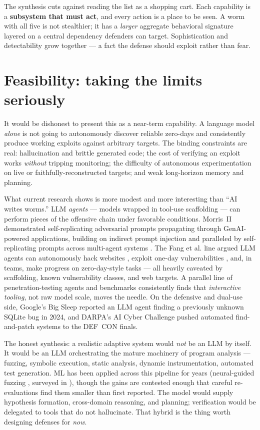 \documentclass[11pt,a4paper]{article}
\begin{document}
The synthesis cuts against reading the list as a shopping cart. Each capability is a \textbf{subsystem that must act}, and every action is a place to be seen. A worm with all five is not stealthier; it has a \emph{larger} aggregate behavioral signature layered on a central dependency defenders can target. Sophistication and detectability grow together --- a fact the defense should exploit rather than fear.

\section{Feasibility: taking the limits seriously}

It would be dishonest to present this as a near-term capability. A language model \emph{alone} is not going to autonomously discover reliable zero-days and consistently produce working exploits against arbitrary targets. The binding constraints are real: hallucination and brittle generated code; the cost of verifying an exploit works \emph{without} tripping monitoring; the difficulty of autonomous experimentation on live or faithfully-reconstructed targets; and weak long-horizon memory and planning.

What current research shows is more modest and more interesting than ``AI writes worms.'' LLM \emph{agents} --- models wrapped in tool-use scaffolding --- can perform pieces of the offensive chain under favorable conditions. Morris~II \cite{morris2} demonstrated self-replicating adversarial prompts propagating through GenAI-powered applications, building on indirect prompt injection \cite{greshake} and paralleled by self-replicating prompts across multi-agent systems \cite{infection}. The Fang et al. line argued LLM agents can autonomously hack websites \cite{fang1}, exploit one-day vulnerabilities \cite{fang2}, and, in teams, make progress on zero-day-style tasks \cite{fang3} --- all heavily caveated by scaffolding, known vulnerability classes, and web targets. A parallel line of penetration-testing agents and benchmarks \cite{happe,pentestgpt,enigma,hacksynth} consistently finds that \emph{interactive tooling}, not raw model scale, moves the needle. On the defensive and dual-use side, Google's Big Sleep reported an LLM agent finding a previously unknown SQLite bug in 2024, and DARPA's AI Cyber Challenge pushed automated find-and-patch systems to the DEF~CON finals.

The honest synthesis: a realistic adaptive system would \emph{not} be an LLM by itself. It would be an LLM orchestrating the mature machinery of program analysis --- fuzzing, symbolic execution, static analysis, dynamic instrumentation, automated test generation. ML has been applied across this pipeline for years (neural-guided fuzzing \cite{neuzz}, surveyed in \cite{mlfuzz}), though the gains are contested enough that careful re-evaluations \cite{revisit} find them smaller than first reported. The model would supply hypothesis formation, cross-domain reasoning, and planning; verification would be delegated to tools that do not hallucinate. That hybrid is the thing worth designing defenses for \emph{now}.
\end{document}
